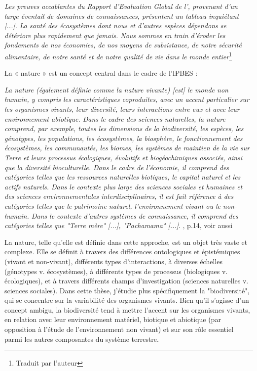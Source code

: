 \begin{displayquote}
\textit{Les preuves accablantes du Rapport d'Evaluation Global de l'\cite{ipbes_2022_6417333}, provenant d'un large éventail de domaines de connaissances, présentent un tableau inquiétant [...]. La santé des écosystèmes dont nous et d'autres espèces dépendons se détériore plus rapidement que jamais. Nous sommes en train d'éroder les fondements de nos économies, de nos moyens de subsistance, de notre sécurité alimentaire, de notre santé et de notre qualité de vie dans le monde entier}\footnote{Traduit par l'auteur}
\end{displayquote}

La « nature » est un concept central dans le cadre de l'IPBES \citep{ipbes_2022_6417333} :

\begin{displayquote} 
\textit{La nature (également définie comme la nature vivante) [est] le monde non humain, y compris les caractéristiques coproduites, avec un accent particulier sur les organismes vivants, leur diversité, leurs interactions entre eux et avec leur environnement abiotique. Dans le cadre des sciences naturelles, la nature comprend, par exemple, toutes les dimensions de la biodiversité, les espèces, les génotypes, les populations, les écosystèmes, la biosphère, le fonctionnement des écosystèmes, les communautés, les biomes, les systèmes de maintien de la vie sur Terre et leurs processus écologiques, évolutifs et biogéochimiques associés, ainsi que la diversité bioculturelle. Dans le cadre de l'économie, il comprend des catégories telles que les ressources naturelles biotiques, le capital naturel et les actifs naturels. Dans le contexte plus large des sciences sociales et humaines et des sciences environnementales interdisciplinaires, il est fait référence à des catégories telles que le patrimoine naturel, l'environnement vivant ou le non-humain. Dans le contexte d'autres systèmes de connaissance, il comprend des catégories telles que "Terre mère" [...], "Pachamama" [...]}.
\hspace*{\fill} \small{ \cite{ipbes_2022_6417333}, p.14, voir aussi \cite{DIAZ20151} }
\end{displayquote}

La nature, telle qu'elle est définie dans cette approche, est un objet très vaste et complexe. Elle se définit à travers des différences ontologiques et épistémiques (vivant et non-vivant), différents types d'interactions, à diverses échelles (génotypes v. écosystèmes), à différents types de processus (biologiques v. écologiques), et à travers différents champs d'investigation (sciences naturelles v. sciences sociales). Dans cette thèse, j'étudie plus spécifiquement la "biodiversité", qui se concentre sur la variabilité des organismes vivants. Bien qu'il s'agisse d'un concept ambigu, la biodiversité tend à mettre l'accent sur les organismes vivants, en relation avec leur environnement matériel, biotique et abiotique (par opposition à l'étude de l'environnement non vivant) et sur son rôle essentiel parmi les autres composantes du système terrestre.

